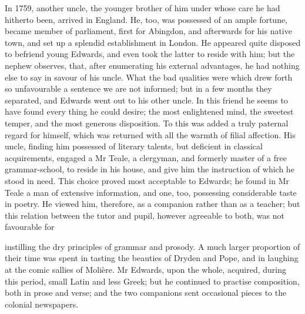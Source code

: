 \documentclass{article}
\begin{document}
In 1759, another uncle, the younger brother of him under whose care he had hitherto been, arrived in England. He, too, was possessed of an ample fortune, became member of parliament, first for Abingdon, and afterwards for his native town, and set up a splendid establishment in London. He appeared quite disposed to befriend young Edwards, and even took the latter to reside with him; but the nephew observes, that, after enumerating his external advantages, he had nothing else to say in savour of his uncle. What the bad qualities were which drew forth so unfavourable a sentence we are not informed; but in a few months they separated, and Edwards went out to his other uncle. In this friend he seems to have found every thing he could desire; the most enlightened mind, the sweetest temper, and the most generous disposition. To this was added a truly paternal regard for himself, which was returned with all the warmth of filial affection. His uncle, finding him possessed of literary talents, but deficient in classical acquirements, engaged a Mr Teale, a clergyman, and formerly master of a free grammar-school, to reside in his house, and give him the instruction of which he stood in need. This choice proved most acceptable to Edwards; he found in Mr Teale a man of extensive information, and one, too, possessing considerable taste in poetry. He viewed him, therefore, as a companion rather than as a teacher; but this relation between the tutor and pupil, however agreeable to both, was not favourable for

instilling the dry principles of grammar and prosody. A much larger proportion of their time was spent in tasting the beauties of Dryden and Pope, and in laughing at the comic sallies of Molière. Mr Edwards, upon the whole, acquired, during this period, small Latin and less Greek; but he continued to practise composition, both in prose and verse; and the two companions sent occasional pieces to the colonial newspapers.
\end{document}
